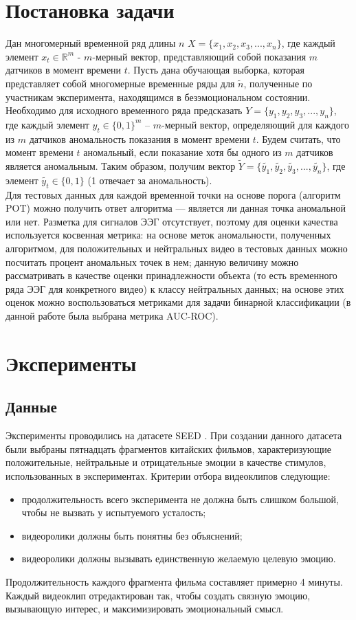 \documentclass{article}
\begin{document}
\section{Постановка задачи}
Дан многомерный временной ряд длины $n$ $X = \{x_1, x_2, x_3, ..., x_n\}$, где каждый элемент $x_t \in \mathbb{R}^{m}$ - $m$-мерный вектор, представляющий собой показания $m$ датчиков в момент времени $t$. Пусть  дана обучающая выборка, которая представляет собой многомерные временные ряды для $\widetilde{n}$, полученные по участникам эксперимента, находящимся в безэмоциональном состоянии. Необходимо для исходного временного ряда предсказать $Y = \{y_1, y_2, y_3, ..., y_n\}$, где каждый элемент $y_t \in \{0, 1\}^{m}$ -- $m$-мерный вектор, определяющий для каждого из $m$ датчиков аномальность показания в момент времени $t$. Будем считать, что момент времени $t$ аномальный, если показание хотя бы одного из $m$ датчиков является аномальным. Таким образом, получим вектор $\widetilde{Y} = \{\widetilde{y_1}, \widetilde{y_2}, \widetilde{y_3}, ..., \widetilde{y_n}\}$, где элемент $\widetilde{y_t} \in \{0, 1\}$ (1 отвечает за аномальность). \\
Для тестовых данных для каждой временной точки на основе порога (алгоритм POT) можно получить ответ алгоритма --- является ли данная точка аномальной или нет. Разметка для сигналов ЭЭГ отсутствует, поэтому для оценки качества используется косвенная метрика: на основе меток аномальности, полученных алгоритмом, для положительных и нейтральных видео в тестовых данных можно посчитать процент аномальных точек в нем; данную величину можно рассматривать в качестве оценки принадлежности объекта (то есть временного ряда ЭЭГ для конкретного видео) к классу нейтральных данных; на основе этих оценок можно воспользоваться метриками для задачи бинарной классификации (в данной работе была выбрана метрика AUC-ROC).

\section{Эксперименты}
\subsection{Данные}
Эксперименты проводились на датасете SEED \cite{seed}. При создании данного датасета были выбраны пятнадцать фрагментов китайских фильмов, характеризующие положительные, нейтральные и отрицательные эмоции в качестве стимулов, использованных в экспериментах. Критерии отбора видеоклипов следующие:
\begin{itemize}
    \item продолжительность всего эксперимента не должна быть слишком большой, чтобы не вызвать у испытуемого усталость;
    \item  видеоролики должны быть понятны без объяснений;
    \item видеоролики должны вызывать единственную желаемую целевую эмоцию.
\end{itemize}
Продолжительность каждого фрагмента фильма составляет примерно 4 минуты. Каждый видеоклип отредактирован так, чтобы создать связную эмоцию, вызывающую интерес, и максимизировать эмоциональный смысл. 
\end{document}
